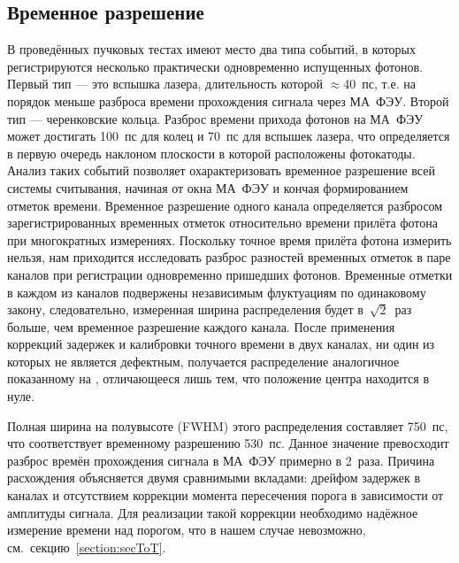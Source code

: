 \subsection{Временное разрешение}\label{section:TimeRes}

В проведённых пучковых тестах имеют место два типа событий, в которых регистрируются несколько практически одновременно испущенных фотонов. Первый тип --- это вспышка лазера, длительность которой $\approx$40~пс, т.е. на порядок меньше разброса времени прохождения сигнала через МА~ФЭУ. Второй тип --- черенковские кольца. Разброс времени прихода фотонов на МА~ФЭУ может достигать 100~пс для колец и 70~пс для вспышек лазера, что определяется в первую очередь наклоном плоскости в которой расположены фотокатоды. Анализ таких событий позволяет охарактеризовать временное разрешение всей системы считывания, начиная от окна МА~ФЭУ и кончая формированием отметок времени. Временное разрешение одного канала определяется разбросом зарегистрированных временных отметок относительно времени прилёта фотона при многократных измерениях. Поскольку точное время прилёта фотона измерить нельзя, нам приходится исследовать разброс разностей временных отметок в паре каналов при регистрации одновременно пришедших фотонов. Временные отметки в каждом из каналов подвержены независимым флуктуациям по одинаковому закону, следовательно, измеренная ширина распределения будет в~$\sqrt 2$~раз больше, чем временное разрешение каждого канала.
После применения коррекций задержек и калибровки точного времени в двух каналах, ни один из которых не является дефектным, получается распределение аналогичное показанному на , отличающееся лишь тем, что положение центра находится в нуле.


Полная ширина на полувысоте (FWHM) этого распределения составляет 750~пс, что соответствует временному разрешению 530~пс. Данное значение превосходит разброс времён прохождения сигнала в МА~ФЭУ примерно в 2~раза. Причина расхождения объясняется двумя сравнимыми вкладами: дрейфом задержек в каналах и отсутствием коррекции момента пересечения порога в зависимости от амплитуды сигнала. Для реализации такой коррекции необходимо надёжное измерение времени над порогом, что в нашем случае невозможно, см.~секцию~\ref{section:secToT}.

